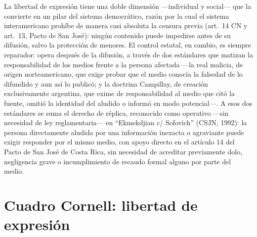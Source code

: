 \documentclass[12pt,oneside]{book}
\begin{document}
\begin{exambox}
La libertad de expresión tiene una doble dimensión —individual y social— que la
convierte en un pilar del sistema democrático, razón por la cual el sistema
interamericano prohíbe de manera casi absoluta la censura previa (art.\ 14 CN y
art.\ 13, Pacto de San José): ningún contenido puede impedirse antes de su
difusión, salvo la protección de menores. El control estatal, en cambio, es
siempre reparador: opera después de la difusión, a través de dos estándares que
matizan la responsabilidad de los medios frente a la persona afectada —la real
malicia, de origen norteamericano, que exige probar que el medio conocía la
falsedad de lo difundido y aun así lo publicó; y la doctrina Campillay, de
creación exclusivamente argentina, que exime de responsabilidad al medio que citó
la fuente, omitió la identidad del aludido o informó en modo potencial—. A esos
dos estándares se suma el derecho de réplica, reconocido como operativo —sin
necesidad de ley reglamentaria— en ``Ekmekdjian c/ Sofovich'' (CSJN, 1992): la
persona directamente aludida por una información inexacta o agraviante puede
exigir responder por el mismo medio, con apoyo directo en el artículo 14 del
Pacto de San José de Costa Rica, sin necesidad de acreditar previamente dolo,
negligencia grave o incumplimiento de recaudo formal alguno por parte del medio.
\end{exambox}

\section{Cuadro Cornell: libertad de expresión}
\end{document}
